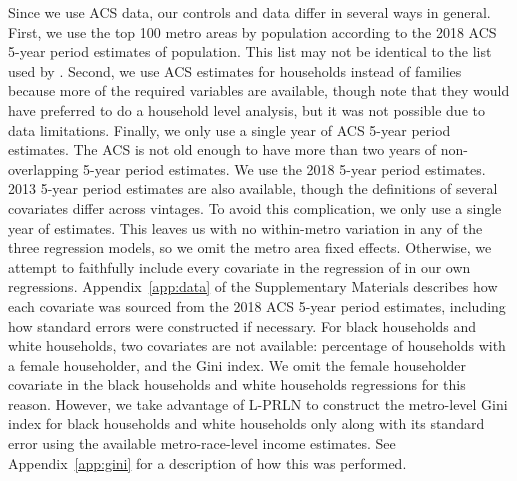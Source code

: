 \documentclass[12pt]{article}
\begin{document}
Since we use ACS data, our controls and data differ in several ways in general. First, we use the top 100 metro areas by population according to the 2018 ACS 5-year period estimates of population. This list may not be identical to the list used by \citet{reardon2011income}. Second, we use ACS estimates for households instead of families because more of the required variables are available, though \citet{reardon2011income} note that they would have preferred to do a household level analysis, but it was not possible due to data limitations. Finally, we only use a single year of ACS 5-year period estimates. The ACS is not old enough to have more than two years of non-overlapping 5-year period estimates. We use the 2018 5-year period estimates. 2013 5-year period estimates are also available, though the definitions of several covariates differ across vintages. To avoid this complication, we only use a single year of estimates. This leaves us with no within-metro variation in any of the three regression models, so we omit the metro area fixed effects. Otherwise, we attempt to faithfully include every covariate in the regression of \citet{reardon2011income} in our own regressions. Appendix~\ref{app:data} of the Supplementary Materials describes how each covariate was sourced from the 2018 ACS 5-year period estimates, including how standard errors were constructed if necessary. For black households and white households, two covariates are not available: percentage of households with a female householder, and the Gini index. We omit the female householder covariate in the black households and white households regressions for this reason. However, we take advantage of L-PRLN to construct the metro-level Gini index for black households and white households only along with its standard error using the available metro-race-level income estimates. See Appendix~\ref{app:gini} for a description of how this was performed. 
\end{document}
